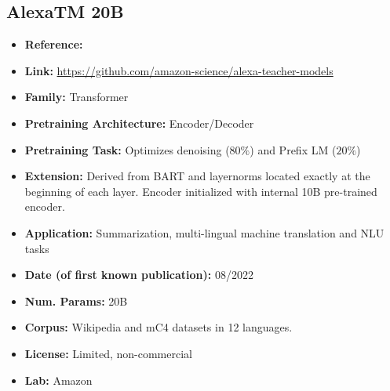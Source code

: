 \documentclass{article}
\begin{document}
\subsection{AlexaTM 20B}
           \begin{itemize}
            \item \textbf{Reference:} 
            \item\textbf{Link:} \url{https://github.com/amazon-science/alexa-teacher-models}
            \item \textbf{Family:} Transformer
            \item \textbf{Pretraining Architecture:} Encoder/Decoder
            \item \textbf{Pretraining Task:} Optimizes denoising ($80\%$) and Prefix LM ($20\%$)
            \item \textbf{Extension:} Derived from BART and layernorms located exactly at the beginning of each layer. Encoder initialized with internal 10B pre-trained encoder.
            \item \textbf{Application:} Summarization, multi-lingual machine translation and NLU tasks
            \item \textbf{Date (of first known publication):} 08/2022
            \item \textbf{Num. Params:} 20B
            \item \textbf{Corpus:}   Wikipedia and mC4 datasets in 12 languages.
            \item \textbf{License:} Limited, non-commercial
            \item \textbf{Lab:} Amazon
            \end{itemize}

\end{document}

